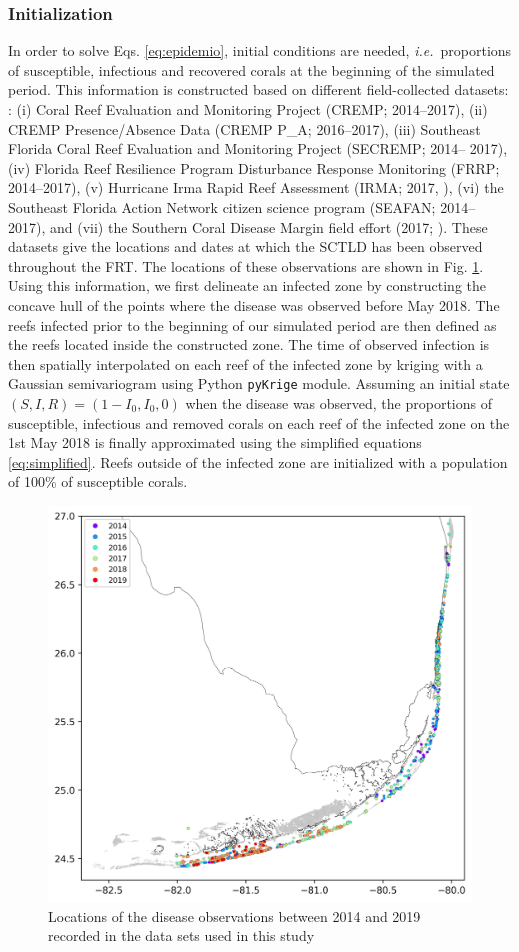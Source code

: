 \documentclass[utf8]{frontiersSCNS}
\newcommand{\ie}{{\it i.e.}\ }
\begin{document}
\subsubsection{Initialization}

In order to solve Eqs. \ref{eq:epidemio}, initial conditions are needed, \ie proportions of susceptible, infectious and recovered corals at the beginning of the simulated period. This information is constructed based on different field-collected datasets: : (i) Coral Reef Evaluation and Monitoring Project (CREMP; 2014–2017), (ii) CREMP Presence/Absence Data (CREMP P\_A; 2016–2017), (iii) Southeast Florida Coral Reef Evaluation and Monitoring Project (SECREMP; 2014– 2017), (iv) Florida Reef Resilience Program Disturbance Response Monitoring (FRRP; 2014–2017), (v) Hurricane Irma Rapid Reef Assessment (IRMA; 2017, \cite{viehman2018}), (vi) the Southeast Florida Action Network citizen science program (SEAFAN; 2014–2017), and (vii) the Southern Coral Disease Margin field effort (2017; \cite{neely2018surveying}). These datasets give the locations and dates at which the SCTLD has been observed throughout the FRT. The locations of these observations are shown in Fig. \ref{fig:stns}. Using this information, we first delineate an infected zone by constructing the concave hull of the points where the disease was observed before May 2018. The reefs infected prior to the beginning of our simulated period are then defined as the reefs located inside the constructed zone. The time of observed infection is then spatially interpolated on each reef of the infected zone by kriging with a Gaussian semivariogram using Python \texttt{pyKrige} module. Assuming an initial state $(S,I,R)=(1-I_0, I_0, 0)$ when the disease was observed, the proportions of susceptible, infectious and removed corals on each reef of the infected zone on the 1st May 2018 is finally approximated using the simplified equations \ref{eq:simplified}. Reefs outside of the infected zone are initialized with a population of 100\% of susceptible corals.  

\begin{figure}
    \center
    \includegraphics[width=.6\textwidth]{figures/monitoring.png}
    \caption{Locations of the disease observations between 2014 and 2019 recorded in the data sets used in this study}
    \label{fig:stns}
\end{figure}
\end{document}

